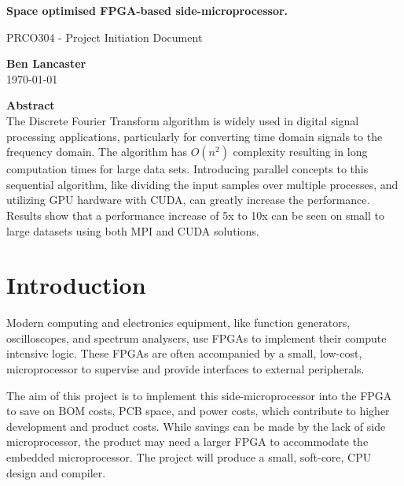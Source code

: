 \documentclass[11pt,a4paper]{article}
\begin{document}
\begin{titlepage}
\begin{center}

\vspace*{3cm}
\Large
\textbf{
Space optimised FPGA-based side-microprocessor.
}

\vspace{0.4cm}
\large
PRCO304 - Project Initiation Document

\vspace{4cm}
\textbf{Ben Lancaster}\\
\today

\vspace{4cm}
\textbf{Abstract}\\
\small
The Discrete Fourier Transform algorithm is widely used in digital signal processing applications, particularly for converting time domain signals to the frequency domain. The algorithm has $O(n^2)$ complexity resulting in long computation times for large data sets. Introducing parallel concepts to this sequential algorithm, like dividing the input samples over multiple processes, and utilizing GPU hardware with CUDA, can greatly increase the performance. Results show that a performance increase of 5x to 10x can be seen on small to large datasets using both MPI and CUDA solutions. 


\end{center}

\end{titlepage}

\renewcommand*\contentsname{Table of Contents}
\tableofcontents
\newpage

\section{Introduction}
Modern computing and electronics equipment, like function generators, oscilloscopes, and spectrum analysers, use FPGAs to implement their compute intensive logic. These FPGAs are often accompanied by a small, low-cost, microprocessor to supervise and provide interfaces to external peripherals.

The aim of this project is to implement this side-microprocessor into the FPGA to save on BOM costs, PCB space, and power costs, which contribute to higher development and product costs. While savings can be made by the lack of side microprocessor, the product may need a larger FPGA to accommodate the embedded microprocessor. The project will produce a small, soft-core, CPU design and compiler.
\end{document}
